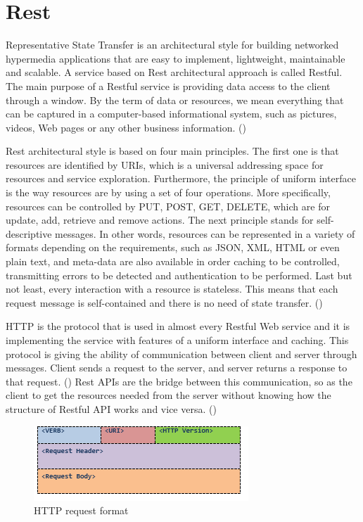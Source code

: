 \section{Rest}
Representative State Transfer is an architectural style for building networked hypermedia applications that are easy to implement, lightweight, maintainable and scalable. A service based on Rest architectural approach is called Restful. The main purpose of a Restful service is providing data access to the client through a window. By the term of data or resources, we mean everything that can be captured in a computer-based informational system, such as pictures, videos, Web pages or any other business information. (\cite{Reference7}) \par

Rest architectural style is based on four main principles. The first one is that resources are identified by URIs, which is a universal addressing space for resources and service exploration. Furthermore, the principle of uniform interface is the way resources are by using a set of four operations. More specifically, resources can be controlled by PUT, POST, GET, DELETE, which are for update, add, retrieve and remove actions. The next principle stands for self-descriptive messages. In other words, resources can be represented in a variety of formats depending on the requirements, such as JSON, XML, HTML or even plain text, and meta-data are also available in order caching to be controlled, transmitting errors to be detected and authentication to be performed. Last but not least, every interaction with a resource is stateless. This means that each request message is self-contained and there is no need of state transfer. (\cite{Reference8}) \par

HTTP is the protocol that is used in almost every Restful Web service and it is implementing the service with features of a uniform interface and caching. This protocol is giving the ability of communication between client and server through messages. Client sends a request to the server, and server returns a response to that request. (\cite{Reference7}) Rest APIs are the bridge between this communication, so as the client to get the resources needed from the server without knowing how the structure of Restful API works and vice versa. (\cite{Reference9}) \par

\begin{figure}[h!]
	\begin{center}
		\includegraphics[scale=0.85]{images/httpFormat.png}
	\end{center}
	\caption{HTTP request format}
\end{figure}

